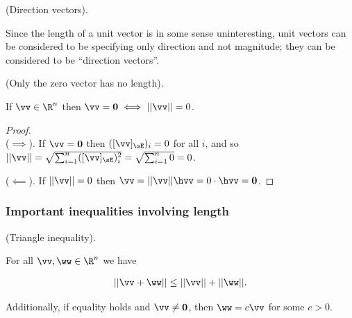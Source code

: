 \begin{remark}
	\label{ch::lin_alg::rmk::direction_vectors}
	(Direction vectors).
	
	Since the length of a unit vector is in some sense uninteresting, unit vectors can be considered to be specifying only direction and not magnitude; they can be considered to be ``direction vectors''.
\end{remark}

\begin{lemma}
\label{ch::lin_alg::lemma::only_zero_vector_has_no_length}
	(Only the zero vector has no length).
	
	If $\vv \in \R^n$ then $\vv = \mathbf{0} \iff ||\vv|| = 0$.
\end{lemma}

\begin{proof} \mbox{} \\ \indent
	($\implies$). If $\vv = \mathbf{0}$ then $([\vv]_\sE)_i = 0$ for all $i$, and so $||\vv|| = \sqrt{\sum_{i = 1}^n ([\vv]_\sE)_i^2} = \sqrt{\sum_{i = 1}^n 0} = 0$.
	
	($\impliedby$). If $||\vv|| = 0$ then $\vv = ||\vv||\hvv = 0 \cdot \hvv = \mathbf{0}$. 
\end{proof}

\subsubsection*{Important inequalities involving length}

\begin{theorem}
\label{ch::lin_alg::thm::triangle_inequality}	
	(Triangle inequality).
	
	For all $\vv, \ww \in \R^n$ we have
	
	\begin{align*}
		||\vv + \ww|| \leq ||\vv|| + ||\ww||.
	\end{align*}
	
	Additionally, if equality holds and $\vv \neq \mathbf{0}$, then $\ww = c\vv$ for some $c > 0$.
\end{theorem}

